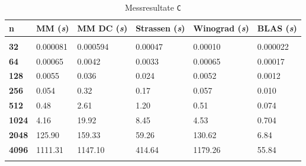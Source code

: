 \begin{table}
			 \begin{center}
					 \begin{tabular}{l l l l l l}
							 \hline
							 \hline
							 \textbf{n} & \textbf{MM (\textit{s})} &  \textbf{MM DC (\textit{s})} & \textbf{Strassen (\textit{s})}  & \textbf{Winograd (\textit{s})} & \textbf{BLAS (\textit{s})} \\
							 \hline
							 \multicolumn{6}{c}{} \\
							 \textbf{32}   & 0.000081 &0.000594 &  0.00047& 0.00010 & 0.000022  \\
							 \textbf{64}   & 0.00065  & 0.0042&  0.0033& 0.00065& 0.00017 \\
							 \textbf{128}  & 0.0055   & 0.036&  0.024&  0.0052 & 0.0012 \\
							 \textbf{256}  & 0.054    & 0.32 & 0.17 &  0.057& 0.010 \\
							 \textbf{512}  & 0.48     & 2.61 & 1.20 & 0.51 &  0.074\\
							 \textbf{1024} & 4.16     & 19.92& 8.45  & 4.53 & 0.704 \\
							 \textbf{2048} & 125.90   & 159.33& 59.26 & 130.62 &  6.84 \\
							 \textbf{4096} & 1111.31  & 1147.10& 414.64 & 1179.26  &  55.84\\
							 \multicolumn{6}{c}{} \\
							 \hline
							 \hline
					 \end{tabular}
			 \end{center}
			 \caption{Messresultate \texttt{C}}
			 \label{multiplikation:tab:messung_C}
	 \end{table}



